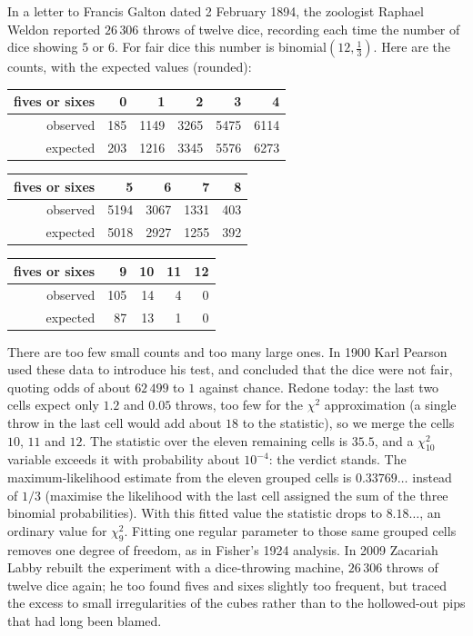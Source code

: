 \begin{example}\label{ex:weldon}
In a letter to Francis Galton dated 2 February 1894, the zoologist Raphael Weldon reported $26\,306$ throws of twelve dice, recording each time the
number of dice showing $5$ or $6$. For fair dice this number is binomial$(12,\frac13)$. Here are the counts, with the expected values (rounded):
\begin{center}
\small
\begin{tabular}{r|rrrrr}
fives or sixes&0&1&2&3&4\\\hline
observed&185&1149&3265&5475&6114\\
expected&203&1216&3345&5576&6273
\end{tabular}
\par\medskip
\begin{tabular}{r|rrrr}
fives or sixes&5&6&7&8\\\hline
observed&5194&3067&1331&403\\
expected&5018&2927&1255&392
\end{tabular}
\par\medskip
\begin{tabular}{r|rrrr}
fives or sixes&9&10&11&12\\\hline
observed&105&14&4&0\\
expected&87&13&1&0
\end{tabular}
\end{center}
There are too few small counts and too many large ones. In 1900 Karl Pearson used these data to introduce his test, and concluded that the dice
were not fair, quoting odds of about $62\,499$ to $1$ against chance. Redone today: the last two cells expect only $1.2$ and $0.05$ throws, too few
for the $\chi^2$ approximation (a single throw in the last cell would add about $18$ to the statistic), so we merge the cells $10$, $11$ and $12$. The
statistic over the eleven remaining cells is $35.5$, and a $\chi^2_{10}$ variable exceeds it with probability about $10^{-4}$: the verdict stands. The maximum-likelihood estimate from the eleven grouped cells is $0.33769\ldots$ instead of $1/3$ (maximise the likelihood with the last cell assigned the sum of the three binomial probabilities). With this fitted value the statistic drops to $8.18\ldots$, an ordinary value for $\chi^2_9$. Fitting one regular parameter to those same grouped cells removes one degree of freedom, as in Fisher's 1924 analysis. In 2009 Zacariah Labby rebuilt the experiment with a dice-throwing
machine, $26\,306$ throws of twelve dice again; he too found fives and sixes slightly too frequent, but traced the excess to small irregularities of
the cubes rather than to the hollowed-out pips that had long been blamed.
\end{example}

